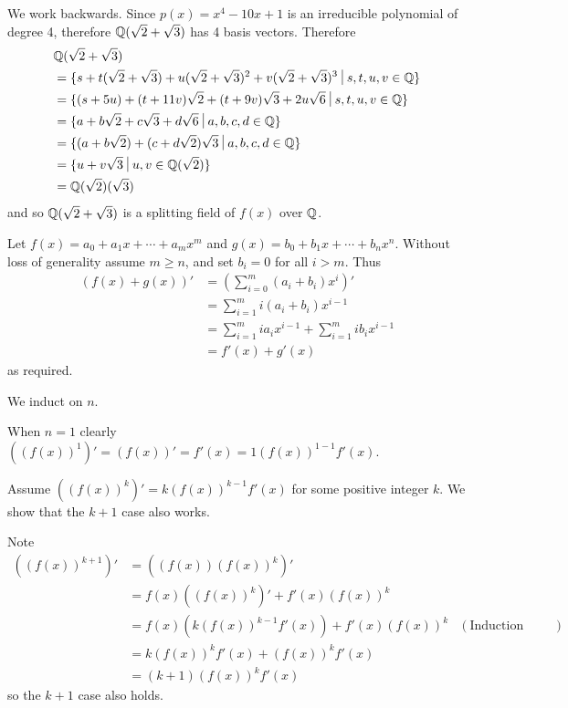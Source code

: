 \begin{questions}
\begin{partquestions}{\roman*}
        \item We work backwards. Since $p(x) = x^4 - 10x + 1$ is an irreducible polynomial of degree 4, therefore $\mathbb{Q}(\sqrt2 + \sqrt3)$ has 4 basis vectors. Therefore
        \begin{align*}
            &\Q(\sqrt2 + \sqrt3)\\
            &= \{s + t(\sqrt2 + \sqrt3) + u(\sqrt2 + \sqrt3)^2 + v(\sqrt2 + \sqrt3)^3 \vert s,t,u,v \in \Q\}\\
            &= \{(s + 5u) + (t + 11v)\sqrt2 + (t + 9v)\sqrt3 + 2u\sqrt6 \vert s, t, u, v \in \Q\}\\
            &= \{a + b\sqrt2 + c\sqrt3 + d\sqrt6 \vert a, b, c, d \in \Q\}\\
            &=\{(a+b\sqrt2) + (c+d\sqrt2)\sqrt3 \vert a, b, c, d \in \Q\}\\
            &=\{u + v\sqrt3 \vert u, v \in \Q(\sqrt2)\}\\
            &= \Q(\sqrt2)(\sqrt3)
        \end{align*}
        and so $\mathbb{Q}(\sqrt2 + \sqrt3)$ is a splitting field of $f(x)$ over $\mathbb{Q}$.
    \end{partquestions}

    \item Let $f(x) = a_0 + a_1x + \cdots + a_mx^m$ and $g(x) = b_0 + b_1x + \cdots + b_nx^n$. Without loss of generality assume $m \geq n$, and set $b_i = 0$ for all $i > m$. Thus
    \begin{align*}
        (f(x) + g(x))' &= \left(\sum_{i=0}^m(a_i + b_i)x^i\right)'\\
        &= \sum_{i=1}^m i(a_i+b_i)x^{i-1}\\
        &= \sum_{i=1}^m ia_ix^{i-1} + \sum_{i=1}^m ib_ix^{i-1}\\
        &= f'(x) + g'(x)
    \end{align*}
    as required.

    \item We induct on $n$.
    
    When $n = 1$ clearly $((f(x))^1)' = (f(x))' = f'(x) = 1(f(x))^{1-1}f'(x)$.

    Assume $((f(x))^k)' = k(f(x))^{k-1}f'(x)$ for some positive integer $k$. We show that the $k+1$ case also works.

    Note
    \begin{align*}
        ((f(x))^{k+1})' &= ((f(x))(f(x))^k)'\\
        &= f(x)((f(x))^k)' + f'(x)(f(x))^k\\
        &= f(x)(k(f(x))^{k-1}f'(x)) + f'(x)(f(x))^k & (\text{Induction Hypothesis})\\
        &= k(f(x))^kf'(x) + (f(x))^kf'(x)\\
        &= (k+1)(f(x))^kf'(x)
    \end{align*}
    so the $k+1$ case also holds.


\end{questions}
